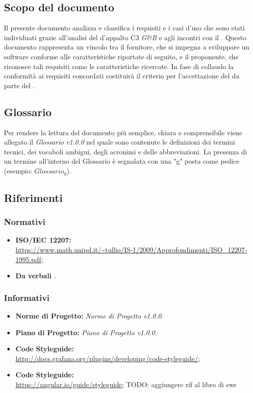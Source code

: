 \subsection{Scopo del documento}
Il presente documento analizza e classifica i requisiti e i casi d'uso che sono stati individuati grazie all'analisi del  d'appalto C3 \emph{G\&B} e agli incontri con il .
Questo documento rappresenta un vincolo tra il fornitore, che si impegna a sviluppare un
software conforme alle caratteristiche riportate di seguito, e il proponente, che riconosce tali
requisiti come le caratteristiche ricercate.
In fase di collaudo la conformità ai requisiti concordati costituirà il criterio per l'accettazione
del  da parte del .
\subsection{Glossario}
Per rendere la lettura del documento più semplice, chiara e comprensibile viene allegato il \emph{Glossario v1.0.0} nel quale sono contenute le definizioni dei termini tecnici, dei vocaboli ambigui, degli acronimi e delle abbreviazioni. La presenza di un termine all'interno del Glossario è segnalata con una "g" posta come pedice (esempio: $Glossario_{g}$).  
\subsection{Riferimenti}
\subsubsection{Normativi}
\begin{itemize}
	\item \textbf{ISO/IEC 12207:}\\ \url{https://www.math.unipd.it/~tullio/IS-1/2009/Approfondimenti/ISO_12207-1995.pdf};
	\item \textbf{Da verbali} \emph{.}
\end{itemize}
\subsubsection{Informativi}
\begin{itemize}
	\item \textbf{Norme di Progetto:} \emph{Norme di Progetto v1.0.0.}
	\item \textbf{Piano di Progetto:} \emph{Piano di Progetto v1.0.0.}
	\item \textbf{ Code Styleguide:} \\
	\url{http://docs.grafana.org/plugins/developing/code-styleguide/};
	\item \textbf{ Code Styleguide:} \\
	\url{https://angular.io/guide/styleguide};
	TODO: aggiungere rif al libro di swe
\end{itemize}
\pagebreak